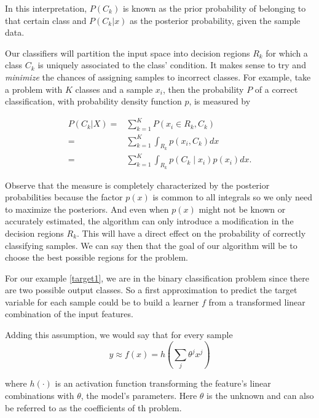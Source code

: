 In this interpretation, $P(C_k)$ is known as the prior probability of belonging to that certain class and $P(C_k|x)$ as the posterior probability, given the sample data.

Our classifiers will partition the input space into decision regions $R_k$ for which a class $C_k$ is uniquely associated to the class' condition.
It makes sense to try and \textit{minimize} the chances of assigning samples to incorrect classes.
For example, take a problem with $K$ classes and a sample $x_i$, then the probability $P$ of a correct classification, with probability density function $p$, is measured by

\begin{equation}\label{eq:goodclassification-equation}
\begin{split}
P(C_k| X) =  & \sum_{k=1}^{K} P(x_i \in R_k, C_k ) \\
		= & \sum_{k=1}^{K} \int_{R_k}p(x_i,C_k) dx \\
		= & \sum_{k=1}^{K} \int_{R_k}p(C_k \mid x_i) p(x_i) dx .
\end{split}
\end{equation}

Observe that the measure is completely characterized by the posterior probabilities because the factor $p(x)$ is common to all integrals so we only need to maximize the posteriors.
And even when $p(x)$ might not be known or accurately estimated, the algorithm can only introduce a modification in the decision regions $R_k$.
This will have a direct effect on the probability of correctly classifying samples.
We can say then that the goal of our algorithm will be to choose the best possible regions for the problem.

For our example \cref{target1}, we are in the binary classification problem since there are two possible output classes.
So a first approximation to predict the target variable for each sample could be to build a learner $f$ from a transformed linear combination of the input features.


Adding this assumption, we would say that for every sample
\begin{equation}
y \approx f(x) = h\left(\sum_{j}\theta^j x^j\right)  \label{formula:1}
\end{equation}

where $h(\cdot)$ is an activation function transforming the feature's linear combinations with $\theta$, the model's parameters.
Here $\theta$ is the unknown and can also be referred to as the coefficients of th problem.
%

